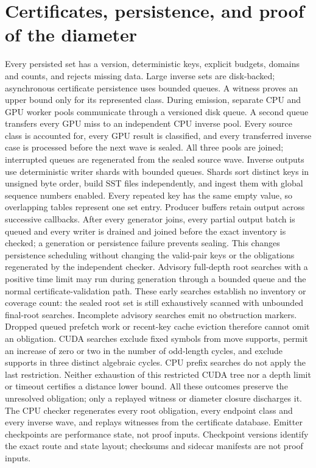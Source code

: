 \documentclass[11pt,a4paper]{article}
\begin{document}
\section{Certificates, persistence, and proof of the diameter}
Every persisted set has a version, deterministic keys, explicit budgets,
domains and counts, and rejects missing data. Large inverse sets are disk-backed;
asynchronous certificate persistence uses bounded queues. A witness proves an
upper bound only for its represented class. During emission, separate CPU and
GPU worker pools communicate through a versioned disk queue. A second queue
transfers every GPU miss to an independent CPU inverse pool. Every source
class is accounted for, every GPU result is classified, and every transferred
inverse case is processed before the next wave is sealed. All three pools
are joined; interrupted queues are regenerated from the sealed source wave.
Inverse outputs use deterministic writer shards with bounded queues. Shards
sort distinct keys in unsigned byte order, build SST files independently,
and ingest them with global sequence numbers enabled. Every repeated key
has the same empty value, so overlapping tables represent one set entry.
Producer buffers retain output across successive callbacks. After every
generator joins, every partial output batch is queued and every writer is
drained and joined before
the exact inventory is checked; a generation or persistence failure prevents
sealing. This changes persistence scheduling without changing the valid-pair
keys or the obligations regenerated by the independent checker.
Advisory full-depth root searches with a positive time limit may run during
generation through a
bounded queue and the normal certificate-validation path. These early
searches establish no inventory or coverage count: the sealed root set is
still exhaustively scanned with unbounded final-root searches. Incomplete
advisory searches emit no obstruction markers. Dropped queued prefetch work or recent-key
cache eviction therefore cannot omit an obligation.
CUDA searches exclude fixed symbols from move supports, permit an increase of
zero or two in the number of odd-length cycles, and exclude supports in three
distinct algebraic cycles. CPU prefix searches do not apply the last
restriction. Neither exhaustion of this restricted CUDA tree nor a depth limit
or timeout certifies a distance lower bound. All these outcomes preserve the unresolved
obligation; only a replayed witness or diameter closure discharges it.
The CPU checker regenerates every
root obligation, every endpoint class and every inverse wave, and replays
witnesses from the certificate database. Emitter checkpoints are performance
state, not proof inputs. Checkpoint versions identify the exact route and state layout; checksums and sidecar manifests are not proof inputs.
\end{document}
